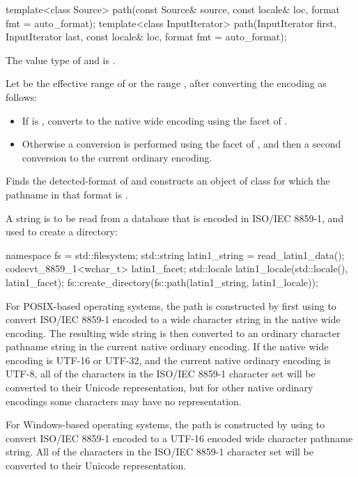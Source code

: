 %
\begin{itemdecl}
template<class Source>
  path(const Source& source, const locale& loc, format fmt = auto_format);
template<class InputIterator>
  path(InputIterator first, InputIterator last, const locale& loc, format fmt = auto_format);
\end{itemdecl}

\begin{itemdescr}
\pnum
\mandates
The value type of  and  is
.

\pnum
\effects
Let  be the effective range of 
or the range ,
after converting the encoding as
follows:
\begin{itemize}
\item
If  is , converts to the native
wide encoding using the 
facet of .
\item
Otherwise a conversion is performed using the
 facet of , and then a second
conversion to the current ordinary encoding.
\end{itemize}

\pnum
Finds the detected-format of 
and constructs an object of class 
for which the pathname in that format is .

\begin{example}
A string is to be read from a database
that is encoded in ISO/IEC 8859-1, and used to create a directory:
\begin{codeblock}
namespace fs = std::filesystem;
std::string latin1_string = read_latin1_data();
codecvt_8859_1<wchar_t> latin1_facet;
std::locale latin1_locale(std::locale(), latin1_facet);
fs::create_directory(fs::path(latin1_string, latin1_locale));
\end{codeblock}
For POSIX-based operating systems, the path is constructed by first using
 to convert ISO/IEC 8859-1 encoded
 to a wide character string in the native wide
encoding. The resulting wide string is then
converted to an ordinary character
pathname string in the current native ordinary encoding. If the
native wide encoding is UTF-16 or UTF-32, and the current native ordinary
encoding is UTF-8, all of the characters in the ISO/IEC 8859-1 character set
will be converted to their Unicode representation, but for other native
ordinary encodings some characters may have no representation.

For Windows-based operating systems, the path is constructed by
using  to convert ISO/IEC 8859-1 encoded
 to a UTF-16 encoded wide character pathname
string. All of the characters in the ISO/IEC 8859-1 character set will be
converted to their Unicode representation.
\end{example}
\end{itemdescr}

